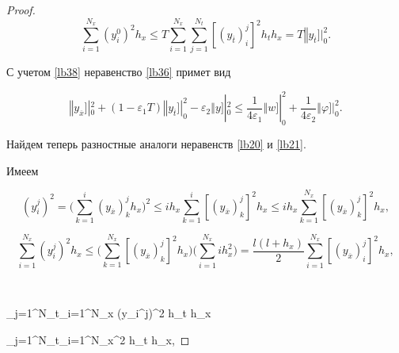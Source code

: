 \begin{proof}
\begin{equation}
\label{lb38}

\sum\limits_{i=1}^{N_x}(y_{i}^{0})^2 h_x \leqslant T\sum\limits_{i=1}^{N_x}\sum\limits_{j=1}^{N_t}\left[(y_{\overline{t}})_{i}^{j}\right]^2 h_t h_x=T\left\Vert y_{\overline{t}}\right.]|_{0}^{2}.

\end{equation}

С учетом \eqref{lb38} неравенство \eqref{lb36} примет вид

\begin{equation}

\label{lb39}

\left\Vert y_{\overline{x}}\right.]|_{0}^{2}+\left(1-\varepsilon_1 T \right)\left\Vert y_{\overline{t}}\right.]|_{0}^{2}-\varepsilon_2 \left\Vert y \right.]|_{0}^{2}\leqslant \frac{1}{4\varepsilon_1}\left\Vert w \right.]|_{0}^{2}+\frac{1}{4\varepsilon_2} \left\Vert \varphi \right.]|_{0}^{2}.

\end{equation}

Найдем теперь разностные аналоги неравенств \eqref{lb20} и \eqref{lb21}. 

Имеем  

$$ 

(y_{i}^{j})^2=\biggl(\sum\limits_{k=1}^{i}\left(y_{\overline{x}}\right)_{k}^{j} h_x\biggr)^2\leqslant

ih_x \sum\limits_{k=1}^{i}\left[\left(y_{\overline{x}}\right)_{k}^{j}\right]^2 h_x \leqslant

ih_x \sum\limits_{k=1}^{N_x}\left[\left(y_{\overline{x}}\right)_{k}^{j}\right]^2 h_x,

$$



$$

\sum\limits_{i=1}^{N_x} (y_{i}^{j})^2 h_x 

\leqslant \biggl(\sum\limits_{k=1}^{N_x}\left[\left(y_{\overline{x}}\right)_{k}^{j}\right]^2 h_x\biggr)\biggl(\sum\limits_{i=1}^{N_x}ih_{x}^{2}\biggr)=

\frac{l(l+h_x)}{2}\sum\limits_{i=1}^{N_x}\left[\left(y_{\overline{x}}\right)_{i}^{j}\right]^2 h_x,

$$



$$

\sum\limits_{j=1}^{N_t}\sum\limits_{i=1}^{N_x} (y_{i}^{j})^2 h_t h_x \leqslant

\sum\limits_{j=1}^{N_t}\sum\limits_{i=1}^{N_x}^2 h_t h_x,


\end{proof}
